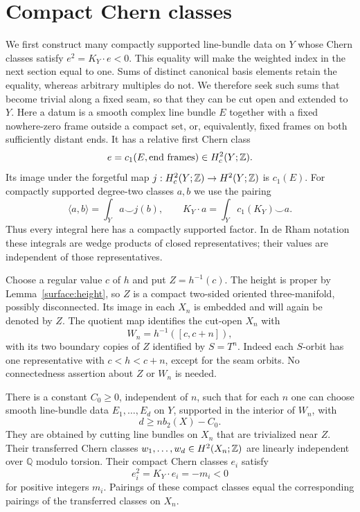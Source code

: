 \section{Compact Chern classes}
\label{sec:compact-data}

We first construct many compactly supported line-bundle data on $Y$
whose Chern classes satisfy $e^2=K_Y\cdot e<0$. This equality will make
the weighted index in the next section equal to one. Sums of distinct
canonical basis elements retain the equality, whereas arbitrary
multiples do not. We therefore seek such sums that become trivial
along a fixed seam, so that they can be cut open and extended to $Y$.
Here a datum is a smooth complex line bundle $E$ together with a fixed
nowhere-zero frame outside a compact set, or, equivalently, fixed frames
on both sufficiently distant ends. It has a relative first Chern class
\[
 e=c_1(E,\text{end frames})\in H_c^2(Y;\mathbb Z).
\]
Its image under the forgetful map
$j:H_c^2(Y;\mathbb Z)\to H^2(Y;\mathbb Z)$ is $c_1(E)$.
For compactly supported degree-two classes $a,b$ we use the pairing
\[
 \langle a,b\rangle=\int_Y a\smile j(b),
 \qquad K_Y\cdot a=\int_Y c_1(K_Y)\smile a.
\]
Thus every integral here has a compactly supported factor. In de Rham
notation these integrals are wedge products of closed representatives;
their values are independent of those representatives.

Choose a regular value $c$ of $h$ and put $Z=h^{-1}(c)$. The height is
proper by Lemma~\ref{surface:height}, so $Z$ is a compact two-sided
oriented three-manifold, possibly disconnected. Its image in each $X_n$
is embedded and will again be denoted by $Z$. The quotient map identifies
the cut-open $X_n$ with
\[
 W_n=h^{-1}([c,c+n]),
\]
with its two boundary copies of $Z$ identified by $S=T^n$. Indeed each
$S$-orbit has one representative with $c<h<c+n$, except for the seam
orbits. No connectedness assertion about $Z$ or $W_n$ is needed.

\begin{lemma}\label{compact:classes}
There is a constant $C_0\geq0$, independent of $n$, such that for each
$n$ one can choose smooth line-bundle data $E_1,\ldots,E_d$ on $Y$,
supported in the interior of $W_n$, with
\begin{equation}\label{compact:rank-bound}
 d\geq n b_2(X)-C_0.
\end{equation}
They are obtained by cutting line bundles on $X_n$ that are trivialized
near $Z$. Their transferred Chern classes
$w_1,\ldots,w_d\in H^2(X_n;\mathbb Z)$ are linearly independent over $\mathbb Q$
modulo torsion. Their compact Chern classes $e_i$ satisfy
\begin{equation}\label{compact:numerical-data}
 e_i^2=K_Y\cdot e_i=-m_i<0
\end{equation}
for positive integers $m_i$. Pairings of these compact classes equal
the corresponding pairings of the transferred classes on $X_n$.
\end{lemma}

